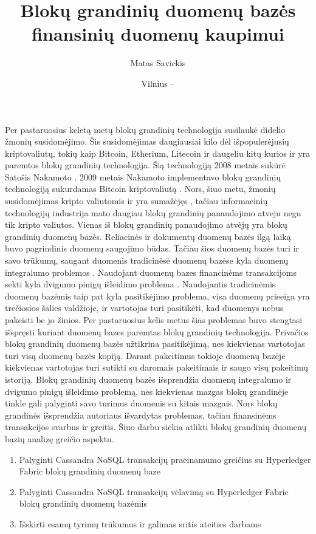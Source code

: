 \documentclass{VUMIFPSkursinis}
\title{Blokų grandinių duomenų bazės finansinių duomenų kaupimui}
\author{Matas Savickis}
\date{Vilnius – \the\year}
\begin{document}
\maketitle

\tableofcontents

Per pastaruosius keletą metų blokų grandinių technologija susilaukė didelio žmonių susidomėjimo. 
Šis susidomėjimas daugiausiai kilo dėl išpopulerėjusių kriptovaliutų, tokių kaip Bitcoin, Etherium, Litecoin ir daugeliu kitų 
kurios ir yra paremtos blokų grandinių technologija. Šią technologiją 2008 metais sukūrė Satošis Nakamoto  \cite{BlockChain}. 
2009 metais Nakamoto implementavo blokų grandinių technologiją sukurdamas Bitcoin kriptovaliutą \cite{Bitcoin}. 
Nors, šiuo metu, žmonių susidomėjimas kripto valiutomis ir yra sumažėjęs \cite{Trends}, tačiau informacinių technologijų industrija 
mato daugiau blokų grandinių panaudojimo atveju negu tik kripto valiutos. Vienas iš blokų grandinių panaudojimo atvėjų yra 
blokų grandinių duomenų bazės. Reliacinės ir dokumentų duomenų bazės ilgą laiką buvo pagrindinis duomenų saugojimo būdas. 
Tačiau šios duomenų bazės turi ir savo trūkumų, saugant duomenis tradicinėsė duomenų bazėse kyla duomenų integralumo problemos \cite{Integrity}
. 
Naudojant duomenų bazes financinėms transakcijoms sekti kyla dvigumo pinigų išleidimo problema\cite{Double}
. Naudojantis tradicinėmis duomenų bazėmis 
taip pat kyla pasitikėjimo problema, visa duomenų prieeiga yra trečiosios šalies valdžioje, ir vartotojas turi pasitikėti, kad duomenys nebus pakeisti be jo žinios.
Per pastaruosius kelis metus šias problemas
 buvo stengtasi išspręsti kuriant duomenų bazes paremtas blokų grandinių technologija. Privačios blokų grandinių duomenų bazės užtikrina pasitikėjimą, nes kiekvienas vartotojas turi visą duomenų 
bazės kopiją. Darant pakeitimus tokioje duomenų bazėje kiekvienas vartotojas turi sutikti su daromais pakeitimais ir saugo visų pakeitimų istoriją. Blokų grandinių duomenų bazės išsprendžia duomenų integralumo ir
dvigumo pinigų išleidimo problemą, nes kiekvienas mazgas blokų grandinėje tinkle gali palyginti savo turimus duomenis su kitais mazgais. 
Nors blokų grandinės išsprendžia autoriaus išvardytas problemas, tačiau finansinėms transakcijos svarbus ir greitis. Šiuo darbu siekia atlikti blokų grandinių duomenų bazių analizę greičio aspektu.

	\begin{enumerate}
		\item{Palyginti Cassandra NoSQL transakcijų praeinamumo greičius su Hyperledger Fabric blokų grandinių duomenų baze}
		\item{Palyginti Cassandra NoSQL transakcijų vėlavimą su Hyperledger Fabric blokų grandinių duomenų bazėmis}
		\item{Išskirti esamų tyrimų trūkumus ir galimas sritis ateities darbams}
		
		
	\end{enumerate}
\pagebreak
\end{document}
